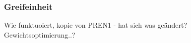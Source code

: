 \documentclass[main.tex]{subfiles} %
\begin{document}

\subsubsection{Greifeinheit}

Wie funktuoiert, kopie von PREN1 - hat sich was geändert?
Gewichtsoptimierung..?
\end{document}
